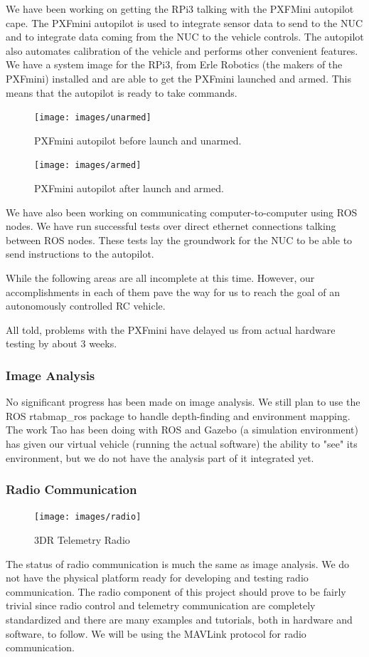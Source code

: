 \documentclass[compsoc,draftclsnofoot,onecolumn,10pt]{IEEEtran}
\begin{document}
\begin{itemize}
We have been working on getting the RPi3 talking with the PXFMini autopilot cape. The PXFmini autopilot is used to integrate sensor data to send to the NUC and to integrate data coming from the NUC to the vehicle controls. The autopilot also automates calibration of the vehicle and performs other convenient features. We have a system image for the RPi3, from Erle Robotics (the makers of the PXFmini) installed and are able to get the PXFmini launched and armed. This means that the autopilot is ready to take commands.\par
\begin{figure}[H]
	\texttt{[image: images/unarmed]}
	\caption{PXFmini autopilot before launch and unarmed.}
\end{figure}

\begin{figure}[H]
	\texttt{[image: images/armed]}
	\caption{PXFmini autopilot after launch and armed.}
\end{figure}

We have also been working on communicating computer-to-computer using ROS nodes. We have run successful tests over direct ethernet connections talking between ROS nodes. These tests lay the groundwork for the NUC to be able to send instructions to the autopilot.\par

While the following areas are all incomplete at this time. However, our accomplishments in each of them pave the way for us to reach the goal of an autonomously controlled RC vehicle.\par

All told, problems with the PXFmini have delayed us from actual hardware testing by about 3 weeks.

\subsubsection{Image Analysis}
No significant progress has been made on image analysis. We still plan to use the ROS rtabmap\_ros package to handle depth-finding and environment mapping. The work Tao has been doing with ROS and Gazebo (a simulation environment) has given our virtual vehicle (running the actual software) the ability to "see" its environment, but we do not have the analysis part of it integrated yet.


\subsubsection{Radio Communication}
\begin{figure}[H]
	\texttt{[image: images/radio]}
	\caption{3DR Telemetry Radio}
\end{figure}
The status of radio communication is much the same as image analysis. We do not have the physical platform ready for developing and testing radio communication. The radio component of this project should prove to be fairly trivial since radio control and telemetry communication are completely standardized and there are many examples and tutorials, both in hardware and software, to follow. We will be using the MAVLink protocol for radio communication.


\end{itemize}
\end{document}
